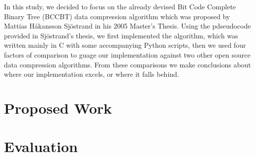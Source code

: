 \documentclass[12pt]{IEEEtran}
\begin{document}
In this study, we decided to focus on the already devised Bit Code Complete Binary Tree (BCCBT) data compression algorithm
which was
proposed by Mattias Håkansson Sjöstrand in his 2005 Master's Thesis\cite{Sjostrand}.
Using the pdseudocode provided in
Sjöstrand's thesis, we first implemented the algorithm, which was written mainly in C with some accompanying Python scripts, then we used four factors of comparison
to guage our implementation against two other open source data compression algorithms. From these comparisons we make conclusions about where our
implementation excels, or where it falls behind.

\section{Proposed Work}


\section{Evaluation}
\end{document}
